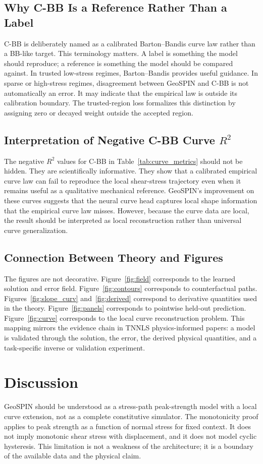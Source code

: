 \documentclass[journal]{IEEEtran}
\begin{document}
\subsection{Why C-BB Is a Reference Rather Than a Label}
C-BB is deliberately named as a calibrated Barton--Bandis curve law rather than a BB-like target. This terminology matters. A label is something the model should reproduce; a reference is something the model should be compared against. In trusted low-stress regimes, Barton--Bandis provides useful guidance. In sparse or high-stress regimes, disagreement between GeoSPIN and C-BB is not automatically an error. It may indicate that the empirical law is outside its calibration boundary. The trusted-region loss formalizes this distinction by assigning zero or decayed weight outside the accepted region.

\subsection{Interpretation of Negative C-BB Curve $R^2$}
The negative $R^2$ values for C-BB in Table~\ref{tab:curve_metrics} should not be hidden. They are scientifically informative. They show that a calibrated empirical curve law can fail to reproduce the local shear-stress trajectory even when it remains useful as a qualitative mechanical reference. GeoSPIN's improvement on these curves suggests that the neural curve head captures local shape information that the empirical curve law misses. However, because the curve data are local, the result should be interpreted as local reconstruction rather than universal curve generalization.

\subsection{Connection Between Theory and Figures}
The figures are not decorative. Figure~\ref{fig:field} corresponds to the learned solution and error field. Figure~\ref{fig:contours} corresponds to counterfactual paths. Figures~\ref{fig:slope_curv} and~\ref{fig:derived} correspond to derivative quantities used in the theory. Figure~\ref{fig:panels} corresponds to pointwise held-out prediction. Figure~\ref{fig:curve} corresponds to the local curve reconstruction problem. This mapping mirrors the evidence chain in TNNLS physics-informed papers: a model is validated through the solution, the error, the derived physical quantities, and a task-specific inverse or validation experiment.
\section{Discussion}
GeoSPIN should be understood as a stress-path peak-strength model with a local curve extension, not as a complete constitutive simulator. The monotonicity proof applies to peak strength as a function of normal stress for fixed context. It does not imply monotonic shear stress with displacement, and it does not model cyclic hysteresis. This limitation is not a weakness of the architecture; it is a boundary of the available data and the physical claim.
\end{document}
